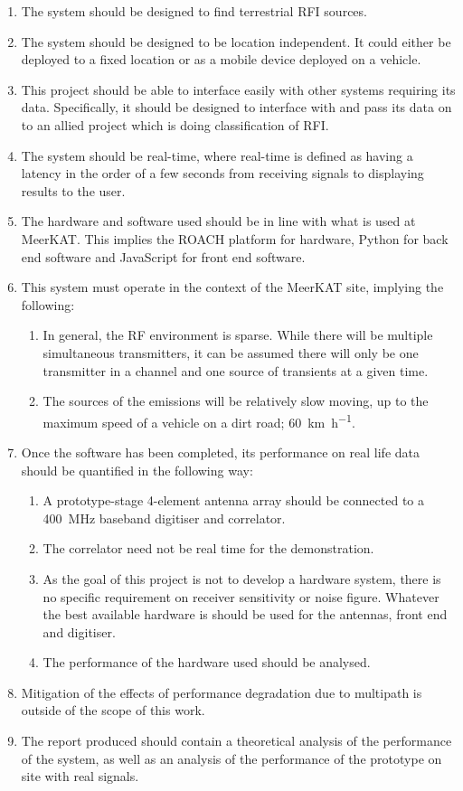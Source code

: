 \begin{enumerate}
\begin{enumerate}
    \end{enumerate}
  \item The system should be designed to find terrestrial RFI sources.
  \item The system should be designed to be location independent. It could either be deployed to a fixed location or as a mobile device deployed on a vehicle.
  \item This project should be able to interface easily with other systems requiring its data. Specifically, it should be designed to interface with and pass its data on to an allied project which is doing classification of RFI.
  \item The system should be real-time, where real-time is defined as having a latency in the order of a few seconds from receiving signals to displaying results to the user. 
  \item The hardware and software used should be in line with what is used at MeerKAT. This implies the ROACH platform for hardware, Python for back end software and JavaScript for front end software.  
  \item This system must operate in the context of the MeerKAT site, implying the following:
  \begin{enumerate}
      \item In general, the RF environment is sparse. While there will be multiple simultaneous transmitters, it can be assumed there will only be one transmitter in a channel and one source of transients at a given time.
      \item The sources of the emissions will be relatively slow moving, up to the maximum speed of a vehicle on a dirt road; \SI[per-mode=symbol]{60}{\kilo\metre\per\hour}.
  \end{enumerate}

  \item Once the software has been completed, its performance on real life data should be quantified in the following way:
    \begin{enumerate}
      \item A prototype-stage 4-element antenna array should be connected to a \SI{400}{\mega\hertz} baseband digitiser and correlator.
      \item The correlator need not be real time for the demonstration.
      \item As the goal of this project is not to develop a hardware system, there is no specific requirement on receiver sensitivity or noise figure. Whatever the best available hardware is should be used for the antennas, front end and digitiser. 
      \item The performance of the hardware used should be analysed. 
    \end{enumerate}
  \item Mitigation of the effects of performance degradation due to multipath is outside of the scope of this work.

  \item The report produced should contain a theoretical analysis of the performance of the system, as well as an analysis of the performance of the prototype on site with real signals. 
\end{enumerate}

